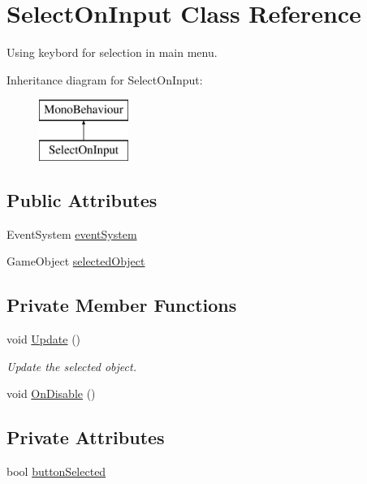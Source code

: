 \hypertarget{class_select_on_input}{}\section{Select\+On\+Input Class Reference}
\label{class_select_on_input}


Using keybord for selection in main menu.  


Inheritance diagram for Select\+On\+Input\+:\begin{figure}[H]
\begin{center}
\leavevmode
\includegraphics[height=2.000000cm]{class_select_on_input}
\end{center}
\end{figure}
\subsection*{Public Attributes}
\begin{DoxyCompactItemize}
\item 
Event\+System \mbox{\hyperlink{class_select_on_input_adf9cd7303f57e21b83a1d7f537158cc0}{event\+System}}
\item 
Game\+Object \mbox{\hyperlink{class_select_on_input_a7c45b36a1cf3101337a96d6a2c18ff5c}{selected\+Object}}
\end{DoxyCompactItemize}
\subsection*{Private Member Functions}
\begin{DoxyCompactItemize}
\item 
void \mbox{\hyperlink{class_select_on_input_a3ffd4bde4e9564050cbe707c8c75d17a}{Update}} ()
\begin{DoxyCompactList}\small\item\em Update the selected object. \end{DoxyCompactList}\item 
void \mbox{\hyperlink{class_select_on_input_a091beca3bb995b8408358b1949d526aa}{On\+Disable}} ()
\end{DoxyCompactItemize}
\subsection*{Private Attributes}
\begin{DoxyCompactItemize}
\item 
bool \mbox{\hyperlink{class_select_on_input_a32ff6bfbb80619aed84e0e66ee1094ab}{button\+Selected}}
\end{DoxyCompactItemize}


